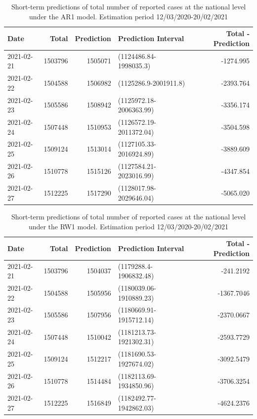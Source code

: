 \documentclass[10pt,letterpaper]{article}
\begin{document}
\begin{table}[!h]

\caption{\label{tab:unnamed-chunk-10}Short-term predictions of total number of reported cases at the national level under the AR1 model. Estimation period 12/03/2020-20/02/2021}
\centering
\begin{tabular}[t]{l|r|r|l|r}
\hline
Date & Total & Prediction & Prediction Interval & Total - Prediction\\
\hline
2021-02-21 & 1503796 & 1505071 & (1124486.84-1998035.3) & -1274.995\\
\hline
2021-02-22 & 1504588 & 1506982 & (1125286.9-2001911.8) & -2393.764\\
\hline
2021-02-23 & 1505586 & 1508942 & (1125972.18-2006363.99) & -3356.174\\
\hline
2021-02-24 & 1507448 & 1510953 & (1126572.19-2011372.04) & -3504.598\\
\hline
2021-02-25 & 1509124 & 1513014 & (1127105.33-2016924.89) & -3889.609\\
\hline
2021-02-26 & 1510778 & 1515126 & (1127584.21-2023016.99) & -4347.854\\
\hline
2021-02-27 & 1512225 & 1517290 & (1128017.98-2029646.04) & -5065.020\\
\hline
\end{tabular}
\end{table}

\begin{table}[!h]

\caption{\label{tab:unnamed-chunk-10}Short-term predictions of total number of reported cases at the national level under the RW1 model. Estimation period 12/03/2020-20/02/2021}
\centering
\begin{tabular}[t]{l|r|r|l|r}
\hline
Date & Total & Prediction & Prediction Interval & Total - Prediction\\
\hline
2021-02-21 & 1503796 & 1504037 & (1179288.4-1906832.48) & -241.2192\\
\hline
2021-02-22 & 1504588 & 1505956 & (1180039.06-1910889.23) & -1367.7046\\
\hline
2021-02-23 & 1505586 & 1507956 & (1180669.91-1915712.14) & -2370.0667\\
\hline
2021-02-24 & 1507448 & 1510042 & (1181213.73-1921302.31) & -2593.7729\\
\hline
2021-02-25 & 1509124 & 1512217 & (1181690.53-1927674.02) & -3092.5479\\
\hline
2021-02-26 & 1510778 & 1514484 & (1182113.69-1934850.96) & -3706.3254\\
\hline
2021-02-27 & 1512225 & 1516849 & (1182492.77-1942862.03) & -4624.2376\\
\hline
\end{tabular}
\end{table}
\end{document}
